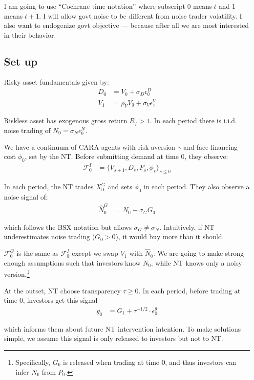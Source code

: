 \documentclass[12pt]{article}
\begin{document}
I am going to use ``Cochrane time notation'' where subscript 0 means $t$ and 1 means $t+1$. I will allow govt noise to be different from noise trader volatility. I also want to endogenize govt objective --- because after all we are most interested in their behavior. 

\subsection{Set up}
Risky asset fundamentals given by:
\begin{align*}
    D_0 & = V_0 + \sigma_D \epsilon_0^D \\
    V_1 & = \rho_V V_0 + \sigma_V \epsilon_1^V
\end{align*}

Riskless asset has exogenous gross return $R_f > 1$. In each period there is i.i.d. noise trading of $N_0 = \sigma_N \epsilon_0^N$. 

We have a continuum of CARA agents with risk aversion $\gamma$ and face financing cost $\phi_0$, set by the NT. Before submitting demand at time 0, they observe:
\begin{align*}
    \mathcal{F}_0^I & = \{V_{s+1},D_s,P_s,\phi_s\}_{s \le 0}
\end{align*}

In each period, the NT trades $X_0^G$ and sets $\phi_0$ in each period. They also observe a noise signal of:
\begin{align*}
    \hat{N}_0^G & = N_0 - \sigma_G G_0
\end{align*}

which follows the BSX notation but allows $\sigma_G \ne \sigma_N$. Intuitively, if NT underestimates noise trading ($G_0 > 0$), it would buy more than it should. 

$\mathcal{F}_0^G$ is the same as $\mathcal{F}_0^I$ except we swap $V_1$ with $\hat{N}_0$. We are going to make strong enough assumptions such that investors know $N_0$, while NT knows only a noisy version.\footnote{Specifically, $G_0$ is released when trading at time 0, and thus investors can infer $N_0$ from $P_0$.} 

At the outset, NT choose transparency $\tau \ge 0$. In each period, before trading at time 0, investors get this signal
\begin{align*}
    g_0 & = G_1 + \tau^{-1/2} \cdot \epsilon_0^g
\end{align*}

\noindent which informs them about future NT intervention intention. To make solutions simple, we assume this signal is only released to investors but not to NT. 
\end{document}
